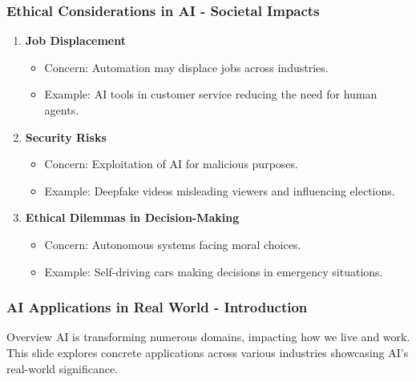 \documentclass[aspectratio=169]{beamer}
\begin{document}
\begin{frame}[fragile]
    \frametitle{Ethical Considerations in AI - Societal Impacts}
    \begin{enumerate}
        \item \textbf{Job Displacement}
            \begin{itemize}
                \item Concern: Automation may displace jobs across industries.
                \item Example: AI tools in customer service reducing the need for human agents.
            \end{itemize}
        \item \textbf{Security Risks}
            \begin{itemize}
                \item Concern: Exploitation of AI for malicious purposes.
                \item Example: Deepfake videos misleading viewers and influencing elections.
            \end{itemize}
        \item \textbf{Ethical Dilemmas in Decision-Making}
            \begin{itemize}
                \item Concern: Autonomous systems facing moral choices.
                \item Example: Self-driving cars making decisions in emergency situations.
            \end{itemize}
    \end{enumerate}
\end{frame}

\begin{frame}[fragile]
    \frametitle{AI Applications in Real World - Introduction}
    \begin{block}{Overview}
        AI is transforming numerous domains, impacting how we live and work. This slide explores concrete applications across various industries showcasing AI's real-world significance.
    \end{block}
\end{frame}
\end{document}
